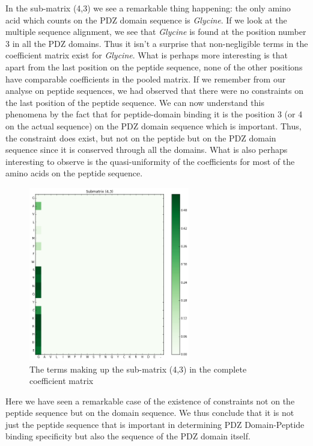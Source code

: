 \documentclass[a4paper, 12pt]{article}
\begin{document}
\begin{enumerate}
In the sub-matrix (4,3) we see a remarkable thing happening: the only amino acid which counts on the PDZ domain sequence is \emph{Glycine}. If we look at the multiple sequence alignment, we see that \emph{Glycine} is found at the position number 3 in all the PDZ domains. Thus it isn't a surprise that non-negligible terms in the coefficient matrix exist for \emph{Glycine}. What is perhaps more interesting is that apart from the last position on the peptide sequence, none of the other positions have comparable coefficients in the pooled matrix. If we remember from our analyse on peptide sequences, we had observed that there were no constraints on the last position of the peptide sequence. We can now understand this phenomena by the fact that for peptide-domain binding it is the position 3 (or 4 on the actual sequence) on the PDZ domain sequence which is important. Thus, the constraint does exist, but not on the peptide but on the PDZ domain sequence since it is conserved through all the domains. What is also perhaps interesting to observe is the quasi-uniformity of the coefficients for most of the amino acids on the peptide sequence. 

\begin{figure}[!h]
\centering
\label{submatrix_43}
\includegraphics[width=7cm]{Images/submatrix_43.png}
\caption{The terms making up the sub-matrix (4,3) in the complete coefficient matrix}
\end{figure}

Here we have seen a remarkable case of the existence of constraints not on the peptide sequence but on the domain sequence. We thus conclude that it is not just the peptide sequence that is important in determining PDZ Domain-Peptide binding specificity but also the sequence of the PDZ domain itself. 

\end{enumerate}
\end{document}
